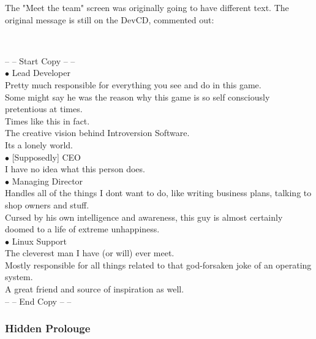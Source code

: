 \documentclass[11pt,twoside,a4paper]{book}
\begin{document}
{The "Meet the team" screen was originally going to have different text. The original message is still on the DevCD, commented out:~\\
\begin{minipage}[ht]{1.50cm} ~\\ \end{minipage} \hfill \begin{minipage}[ht]{15.00cm}
	\begin{ttfamily}
		-- -- Start Copy -- -- ~\\
		$\bullet$ Lead Developer ~\\
		Pretty much responsible for everything you see and do in this game. ~\\
		Some might say he was the reason why this game is so self consciously pretentious at times. ~\\
		Times like this in fact. ~\\
		The creative vision behind Introversion Software. ~\\
		Its a lonely world. ~\\
		$\bullet$ [Supposedly] CEO ~\\
		I have no idea what this person does. ~\\
		$\bullet$ Managing Director ~\\
		Handles all of the things I dont want to do, like writing business plans, talking to shop owners and stuff. ~\\
		Cursed by his own intelligence and awareness, this guy is almost certainly doomed to a life of extreme unhappiness. ~\\
		$\bullet$ Linux Support ~\\
		The cleverest man I have (or will) ever meet. ~\\
		Mostly responsible for all things related to that god-forsaken joke of an operating system. ~\\
		A great friend and source of inspiration as well. ~\\
		-- -- End Copy -- -- ~\\
	\end{ttfamily}
\end{minipage} %

\subsubsection{Hidden Prolouge}

}
\end{document}

